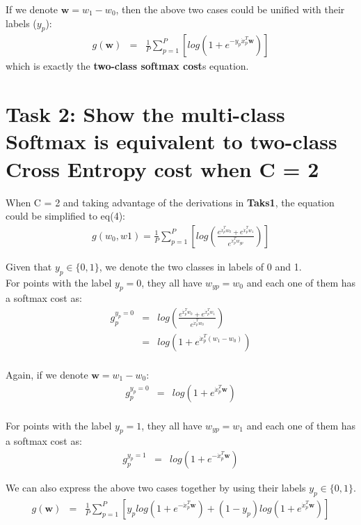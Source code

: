 If we denote $\textbf{w} = w_1 - w_0$, then the above two cases could be unified with their labels ($y_p$):
\begin{eqnarray}
    g(\textbf{w}) &=& \frac{1}{P} \sum_{p=1}^{P} [ log (1 +  e^{- y_p \dot{x}_p^T \textbf{w}} )]
\end{eqnarray}
which is exactly the \textbf{two-class softmax cost}s equation.

\newpage
\section*{\textbf{Task 2: Show the multi-class Softmax is equivalent to two-class Cross Entropy cost when C = 2}}

When C = 2 and taking advantage of the derivations in \textbf{Taks1}, the equation could be simplified to eq(4):
\begin{align*}
    g(w_0, w1) = \frac{1}{P} \sum_{p=1}^{P} [ log ( \frac{ e^{\dot{x}_p^T w_0} + e^{\dot{x}_p^T w_1}}{e^{\dot{x}_p^T w_{yp}}} ) ] 
\end{align*}

Given that $y_p \in \{0, 1\}$, we denote the two classes in labels of 0 and 1.\\
For points with the label $y_p = 0$, they all have $w_{{yp}} = w_0$ and each one of them has a softmax cost as:
\begin{eqnarray}
    g_p^{y_p=0} &=& log (\frac{ e^{\dot{x}_p^T w_0} + e^{\dot{x}_p^T w_1}}{e^{\dot{x}_p^T w_0}}) \\
    &=& log (1 + e^{\dot{x}_p^T (w_1-w_0)}) \\
\end{eqnarray}

Again, if we denote $\textbf{w} = w_1 - w_0$:
\begin{eqnarray}
    g_p^{y_p=0} &=& log (1 + e^{\dot{x}_p^T \textbf{w}}) \\
\end{eqnarray}

For points with the label $y_p = 1$, they all have $w_{{yp}} = w_1$ and each one of them has a softmax cost as:
\begin{eqnarray}
    g_p^{y_p=1} &=& log (1 + e^{- \dot{x}_p^T \textbf{w}}) 
\end{eqnarray}

We can also express the above two cases together by using their labels $y_p \in \{0, 1\}$.
\begin{eqnarray}
    g(\textbf{w}) &=& \frac{1}{P} \sum_{p=1}^{P} [ y_p log (1 + e^{- \dot{x}_p^T \textbf{w}}) + (1 - y_p) log (1 + e^{\dot{x}_p^T \textbf{w}}) ]  
\end{eqnarray}

